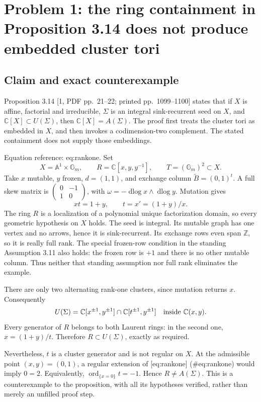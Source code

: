 \documentclass[10pt]{article}
\begin{document}
\section*{Problem 1: the ring containment in Proposition 3.14 does not produce embedded cluster tori}
\subsection*{Claim and exact counterexample}
Proposition 3.14 [1, PDF pp. 21–22; printed pp. 1099–1100] states that if \(X\) is affine, factorial and irreducible, \(\Sigma\) is an integral sink-recurrent seed on \(X\), and \(\mathbb C[X]\subset U(\Sigma)\), then \(\mathbb C[X]=A(\Sigma)\). The proof first treats the cluster tori as embedded in \(X\), and then invokes a codimension-two complement. The stated containment does not supply those embeddings.\par
Equation reference: eq:rankone. Set \[X=\mathbb A^1\times\mathbb G_m,\qquad R=\mathbb C[x,y,y^{-1}],
 \qquad T=(\mathbb G_m)^2\subset X.\] Take \(x\) mutable, \(y\) frozen, \(d=(1,1)\), and exchange column \(\widetilde B=(0,1)^t\). A full skew matrix is \(\left(\begin{smallmatrix}0&-1\\1&0\end{smallmatrix}\right)\), with \(\omega=-\operatorname{dlog}x\wedge\operatorname{dlog}y\). Mutation gives \[
 xt=1+y,\qquad t=x'=(1+y)/x .\] The ring \(R\) is a localization of a polynomial unique factorization domain, so every geometric hypothesis on \(X\) holds. The seed is integral. Its mutable graph has one vertex and no arrows, hence it is sink-recurrent. Its exchange rows even span \(\mathbb Z\), so it is really full rank. The special frozen-row condition in the standing Assumption 3.11 also holds: the frozen row is \(+1\) and there is no other mutable column. Thus neither that standing assumption nor full rank eliminates the example.\par
There are only two alternating rank-one clusters, since mutation returns \(x\). Consequently \[U(\Sigma)=
 \mathbb C[x^{\pm1},y^{\pm1}]\cap\mathbb C[t^{\pm1},y^{\pm1}]
 \quad\hbox{inside }\mathbb C(x,y).\] Every generator of \(R\) belongs to both Laurent rings: in the second one, \(x=(1+y)/t\). Therefore \(R\subset U(\Sigma)\), exactly as required.\par
Nevertheless, \(t\) is a cluster generator and is not regular on \(X\). At the admissible point \((x,y)=(0,1)\), a regular extension of [eq:rankone] (\#eq:rankone) would imply \(0=2\). Equivalently, \(\operatorname{ord}_{\{x=0\}}t=-1\). Hence \(R\ne A(\Sigma)\). This is a counterexample to the proposition, with all its hypotheses verified, rather than merely an unfilled proof step.\par
\end{document}
